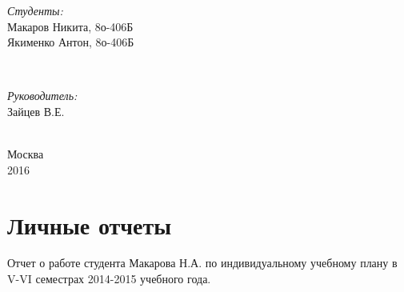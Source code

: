 \documentclass[a4paper,12pt]{article}
\begin{document}
\begin{titlepage}

\begin{minipage}{0.4\textwidth}
\begin{flushleft} \large
\emph{Студенты:}\\
Макаров Никита, 8о-406Б\\Якименко Антон, 8о-406Б
\end{flushleft}
\end{minipage}
~
\begin{minipage}{0.4\textwidth}
\begin{flushright} \large
\emph{Руководитель:} \\
Зайцев В.Е.
\end{flushright}
\end{minipage}\\[2cm]


\vspace{190px}
{\large Москва\\2016}\\[2cm] %

\vfill %

\end{titlepage}



\tableofcontents
\newpage



\section{Личные отчеты}

Отчет о работе студента Макарова Н.А. по индивидуальному учебному плану в V-VI семестрах 2014-2015 учебного года.
\end{document}
